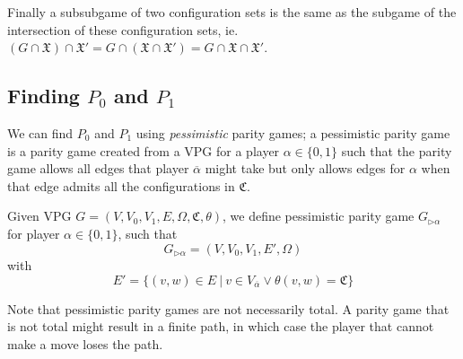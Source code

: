 Finally a subsubgame of two configuration sets is the same as the subgame of the intersection of these configuration sets, ie. $(G \cap \mathfrak{X}) \cap \mathfrak{X}' = G \cap (\mathfrak{X} \cap \mathfrak{X}') = G \cap \mathfrak{X} \cap \mathfrak{X}'$.

\subsection{Finding $P_0$ and $P_1$}
We can find $P_0$ and $P_1$ using \textit{pessimistic} parity games; a pessimistic parity game is a parity game created from a VPG for a player $\alpha \in \{0,1\}$ such that the parity game allows all edges that player $\overline{\alpha}$ might take but only allows edges for $\alpha$ when that edge admits all the configurations in $\mathfrak{C}$.
\begin{definition}
	\label{def_pess_game}
	Given VPG $G = (V,V_0,V_1,E,\Omega, \mathfrak{C},\theta)$, we define pessimistic parity game $G_{\triangleright\alpha}$ for player $\alpha \in \{0,1\}$, such that
	\[ G_{\triangleright\alpha} = (V,V_0,V_1,E',\Omega ) \]
	with
	\[ E' = \{ (v,w) \in E\ |\ v \in V_{\overline{\alpha}} \vee \theta(v,w) = \mathfrak{C} \} \]
\end{definition}


Note that pessimistic parity games are not necessarily total. A parity game that is not total might result in a finite path, in which case the player that cannot make a move loses the path.

